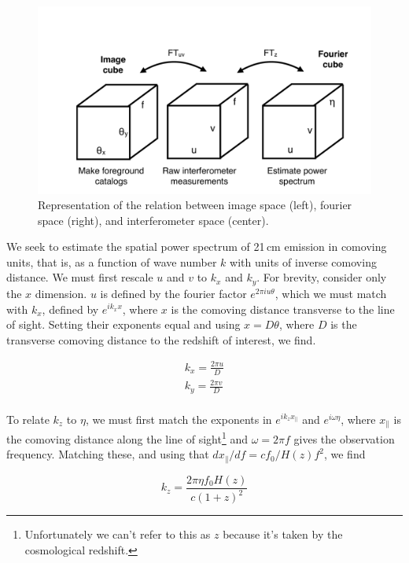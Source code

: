 \begin{figure}[h]
    \centering
    \includegraphics[width=1\textwidth]{chap0_intro/ifo_space.pdf}
    \caption{Representation of the relation between image space (left), fourier space (right), and interferometer space (center).}
    \label{fig:ifospace}
\end{figure}

We seek to estimate the spatial power spectrum of 21\,cm emission in comoving units, that is, as a function of wave number $k$ with units of inverse comoving distance. We must first rescale $u$ and $v$ to $k_x$ and $k_y$. For brevity, consider only the $x$ dimension. $u$ is defined by the fourier factor $e^{2\pi i u\theta}$, which we must match with $k_x$, defined by $e^{ik_x x}$, where $x$ is the comoving distance transverse to the line of sight. Setting their exponents equal and using $x=D\theta$, where $D$ is the transverse comoving distance to the redshift of interest, we find.

\begin{eqnarray}
	k_x=\frac{2\pi u}{D} \\ 
	k_y=\frac{2\pi v}{D} \\ 
\end{eqnarray}

To relate $k_z$ to $\eta$, we must first match the exponents in $e^{i k_z x_\parallel}$ and $e^{i\omega \eta}$, where $x_\parallel$ is the comoving distance along the line of sight\footnote{Unfortunately we can't refer to this as $z$ because it's taken by the cosmological redshift.} and $\omega=2\pi f$ gives the observation frequency. Matching these, and using that $d x_\parallel/df=cf_0/H(z)f^2$, we find

\begin{equation}
	k_z=\frac{2\pi\eta f_0 H(z)}{c(1+z)^2}
\end{equation}

